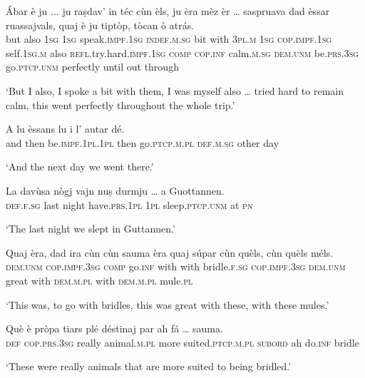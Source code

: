 \begin{linenumbers}
\gll Ábar è ju ... ju raṣdav' in téc cùn èls, ju èra mèz èr … saspruava dad èssar ruassajvals, quaj è ju tiptòp, tòcan ò atrás.\\
but also \textsc{1sg} {} \textsc{1sg} speak.\textsc{impf.1sg} \textsc{indef.m.sg} bit with \textsc{3pl.m} \textsc{1sg} \textsc{cop.impf.1sg} self.\textsc{1sg.m} also {} \textsc{refl.}try.hard.\textsc{impf.1sg} \textsc{comp} \textsc{cop.inf} calm.\textsc{m.sg} \textsc{dem.unm} be.\textsc{prs.3sg} go.\textsc{ptcp.unm} perfectly until out through \\
\end{linenumbers} 
\medskip
\glt `But I also, I spoke a bit with them, I was myself also … tried hard to remain calm, this went perfectly throughout the whole trip.'
\medskip

\begin{linenumbers}
\gll  A lu èssans lu i l’ autar dé.  \\
and then be.\textsc{impf.1pl.1pl} then go.\textsc{ptcp.m.pl} \textsc{def.m.sg} other day \\
\end{linenumbers}
\medskip
\glt `And the next day we went there.'
\medskip

\begin{linenumbers}
\gll   La davùsa nògj vajn nuṣ durmju … a Guottannen. \\
 \textsc{def.f.sg} last night have.\textsc{prs.1pl} \textsc{1pl} sleep.\textsc{ptcp.unm} {} at \textsc{pn} \\
\end{linenumbers}
\medskip
\glt `The last night we slept in Guttannen.'
\medskip

\begin{linenumbers}
\gll Quaj èra, dad ira cùn cùn sauma èra quaj súpar cùn quèls, cùn quèls méls.   \\
 \textsc{dem.unm} \textsc{cop.impf.3sg} \textsc{comp} go.\textsc{inf} with with bridle.\textsc{f.sg} \textsc{cop.impf.3sg} \textsc{dem.unm} great with \textsc{dem.m.pl} with \textsc{dem.m.pl} mule.\textsc{pl}\\
\end{linenumbers}
\medskip
\glt `This was, to go with bridles, this was great with these, with these mules.'
\medskip

\begin{linenumbers}
\gll  Què è pròpa tiars plé déstinaj par ah fá … sauma.\\
 \textsc{def} \textsc{cop.prs.3sg} really animal.\textsc{m.pl} more suited.\textsc{ptcp.m.pl} \textsc{subord} ah do.\textsc{inf} {} bridle \\
\end{linenumbers}
\medskip
\glt `These were really animals that are more suited to being bridled.'
\medskip


